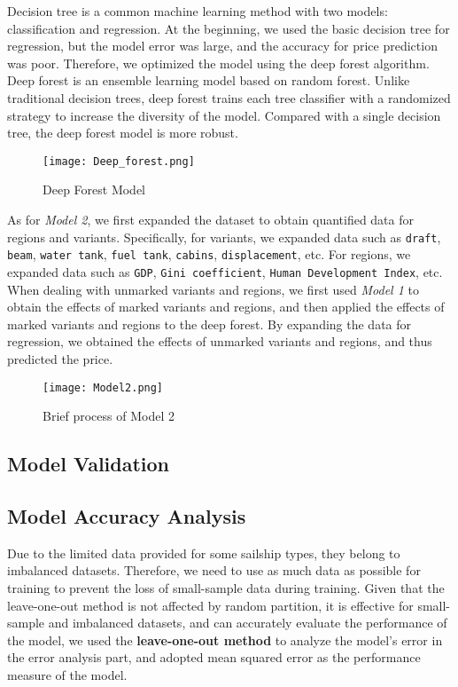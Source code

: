\documentclass[12pt]{article}  %
\begin{document}
Decision tree is a common machine learning method with two models: classification and regression. 
At the beginning, we used the basic decision tree for regression, but the model error was large, 
and the accuracy for price prediction was poor. 
Therefore, we optimized the model using the deep forest algorithm. 
Deep forest is an ensemble learning model based on random forest. 
Unlike traditional decision trees, deep forest trains each tree classifier with a randomized strategy to increase the diversity of the model.
Compared with a single decision tree, the deep forest model is more robust. 

\begin{figure}[htbp]
    \centering
    \texttt{[image: Deep\_forest.png]}
    \caption{Deep Forest Model}\label{fig:DF}
\end{figure}


As for \emph{Model 2}, we first expanded the dataset to obtain quantified data for regions and variants.
Specifically, for variants, we expanded data such as \texttt{draft}, \texttt{beam}, \texttt{water tank}, \texttt{fuel tank}, \texttt{cabins}, \texttt{displacement}, etc. 
For regions, we expanded data such as \texttt{GDP}, \texttt{Gini coefficient}, \texttt{Human Development Index}, etc. 
When dealing with unmarked variants and regions, we first used \emph{Model 1} to obtain the effects of marked variants and regions, and then applied the effects of marked variants and regions to the deep forest. 
By expanding the data for regression, we obtained the effects of unmarked variants and regions, and thus predicted the price.

\begin{figure}[htbp]
    \centering
    \texttt{[image: Model2.png]}
    \caption{Brief process of Model 2}\label{fig:Model2}
\end{figure}


\subsection{Model Validation}

\subsection{Model Accuracy Analysis}
Due to the limited data provided for some sailship types, 
they belong to imbalanced datasets. 
Therefore, we need to use as much data as possible for training to prevent the loss of small-sample data during training. 
Given that the leave-one-out method is not affected by random partition, 
it is effective for small-sample and imbalanced datasets, 
and can accurately evaluate the performance of the model, 
we used the \textbf{leave-one-out method} to analyze the model's error in the error analysis part, 
and adopted mean squared error as the performance measure of the model.
\end{document}
